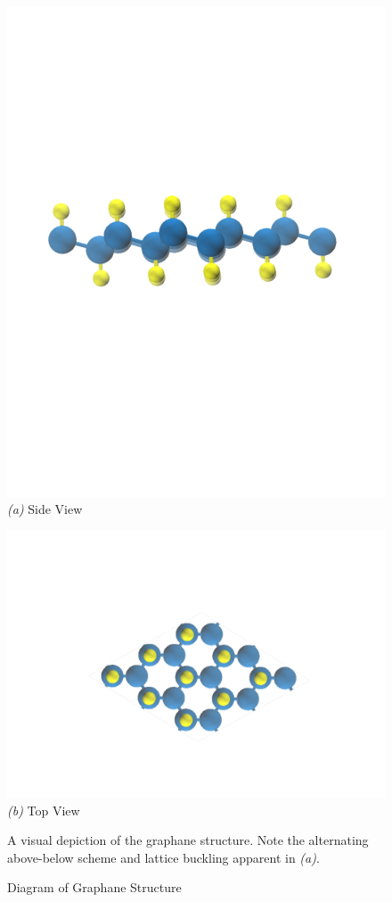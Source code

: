 \documentclass[oneside, noacknowlegments]{BYUPhys}
\begin{document}
\begin{figure}
	\centering
	\begin{minipage}[Test 1]{0.475\textwidth}
		\includegraphics[width=\textwidth]
			{graphane_diagram_cropped}
		\centering \textit{(a)} Side View
	\end{minipage}
	\hfill
	\begin{minipage}[Test 2]{0.475\textwidth}
		\includegraphics[width=\textwidth]{graphane_diagram_top}	\\
		\centering \textit{(b)} Top View
	\end{minipage}
	\raggedright
	\caption{Diagram of Graphane Structure}
	{\label{fig:GraphaneDiagram}	A visual depiction of the graphane 
	 structure. Note the alternating above-below scheme and lattice 
	 buckling apparent in \textit{(a)}.}
\end{figure}
\end{document}
